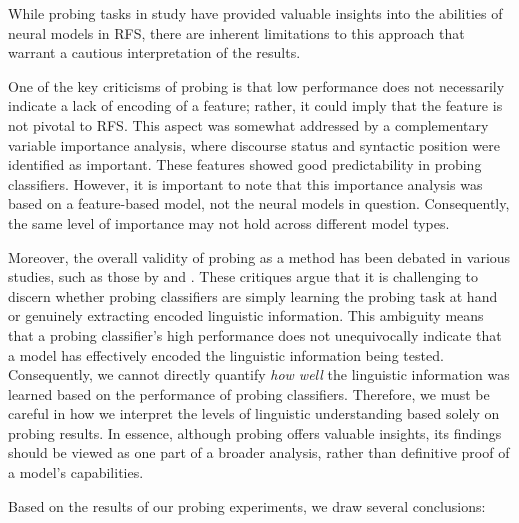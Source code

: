 While probing tasks in study \studG have provided valuable insights into the abilities of neural models in RFS, there are inherent limitations to this approach that warrant a cautious interpretation of the results.

One of the key criticisms of probing is that low performance does not necessarily indicate a lack of encoding of a feature; rather, it could imply that the feature is not pivotal to RFS. This aspect was somewhat addressed by a complementary variable importance analysis, where discourse status and syntactic position were identified as important. These features showed good predictability in probing classifiers. However, it is important to note that this importance analysis was based on a feature-based model, not the neural models in question. Consequently, the same level of importance may not hold across different model types.

Moreover, the overall validity of probing as a method has been debated in various studies, such as those by \citet{hewitt-liang-2019-designing} and \citet{kunz-kuhlmann-2020-classifier}. These critiques argue that it is challenging to discern whether probing classifiers are simply learning the probing task at hand or genuinely extracting encoded linguistic information. This ambiguity means that a probing classifier's high performance does not unequivocally indicate that a model has effectively encoded the linguistic information being tested. Consequently, we cannot directly quantify \emph{how well} the linguistic information was learned based on the performance of probing classifiers. Therefore, we must be careful in how we interpret the levels of linguistic understanding based solely on probing results. In essence, although probing offers valuable insights, its findings should be viewed as one part of a broader analysis, rather than definitive proof of a model's capabilities.

Based on the results of our probing experiments, we draw several conclusions: 


